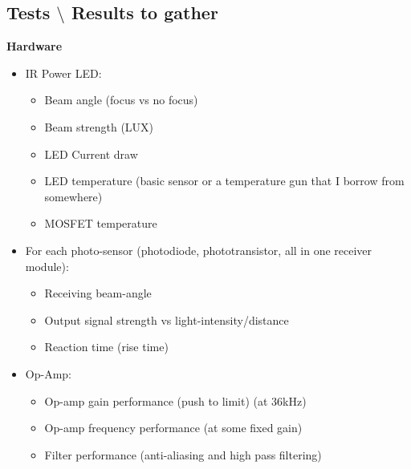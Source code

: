 \subsection{Tests $\setminus$ Results to gather}
\textbf{Hardware}
\begin{itemize}
	\item IR Power LED:
	\begin{itemize}
		\item Beam angle (focus vs no focus)
		\item Beam strength (LUX)
		\item LED Current draw
		\item LED temperature (basic sensor or a temperature gun that I borrow from somewhere)
		\item MOSFET temperature
	\end{itemize}
	\item For each photo-sensor (photodiode, phototransistor, all in one receiver module):
	\begin{itemize}
		\item Receiving beam-angle
		\item Output signal strength vs light-intensity/distance
		\item Reaction time (rise time)
	\end{itemize}
	\item Op-Amp:
	\begin{itemize}
		\item Op-amp gain performance (push to limit) (at 36kHz)
		\item Op-amp frequency performance (at some fixed gain)
		\item Filter performance (anti-aliasing and high pass filtering)
	\end{itemize}
\end{itemize}

